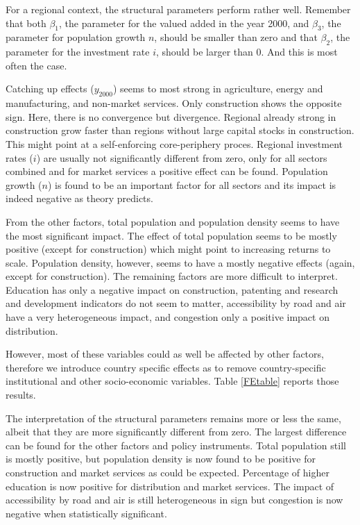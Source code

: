\documentclass[11pt,parskip,abstracton,notitlepage, paper=a4]{scrartcl}
\begin{document}
For a regional context, the structural parameters perform rather well. Remember that both $\beta_1$, the parameter for the valued added in the year 2000, and $\beta_3$, the parameter for population growth $n$, should be smaller than zero and that $\beta_2$, the parameter for the investment rate $i$, should be larger than 0. And this is most often the case. 

Catching up effects ($y_{2000}$) seems to most strong in agriculture, energy and manufacturing, and non-market services. Only construction shows the opposite sign. Here, there is no convergence but divergence. Regional already strong in construction grow faster than regions without large capital stocks in construction. This might point at a self-enforcing core-periphery proces. 
Regional investment rates ($i$) are usually not significantly different from zero, only for all sectors combined and for market services a positive effect can be found. 
Population growth ($n$) is found to be an important factor for all sectors and its impact is indeed negative as theory predicts.  

From the other factors, total population and population density seems to have the most significant impact. The effect of total population seems to be mostly positive (except for construction) which might point to increasing returns to scale. Population density, however, seems to have a mostly negative effects (again, except for construction). The remaining factors are more difficult to interpret. Education has only a negative impact on construction, patenting and research and development indicators do not seem to matter, accessibility by road and air have a very heterogeneous impact, and congestion only a positive impact on distribution.

\begin{landscape}
	
\end{landscape}

However, most of these variables could as well be affected by other factors, therefore we introduce country specific effects as to remove country-specific institutional and other socio-economic variables. Table \ref{FEtable} reports those results. 

The interpretation of the structural parameters remains more or less the same, albeit that they are more significantly different from zero. The largest difference can be found for the other factors and policy instruments. Total population still is mostly positive, but population density is now found to be positive for construction and market services as could be expected. Percentage of higher education is now positive for distribution and market services. The impact of accessibility by road and air is still heterogeneous in sign but congestion is now negative when statistically significant. 
\end{document}

